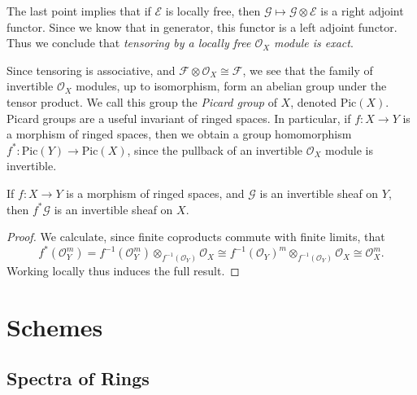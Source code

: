 The last point implies that if $\mathcal{E}$ is locally free, then $\mathcal{G} \mapsto \mathcal{G} \otimes \mathcal{E}$ is a right adjoint functor. Since we know that in generator, this functor is a left adjoint functor. Thus we conclude that \emph{tensoring by a locally free $\mathcal{O}_X$ module is exact}.

Since tensoring is associative, and $\mathcal{F} \otimes \mathcal{O}_X \cong \mathcal{F}$, we see that the family of invertible $\mathcal{O}_X$ modules, up to isomorphism, form an abelian group under the tensor product. We call this group the \emph{Picard group} of $X$, denoted $\text{Pic}(X)$. Picard groups are a useful invariant of ringed spaces. In particular, if $f: X \to Y$ is a morphism of ringed spaces, then we obtain a group homomorphism $f^*: \text{Pic}(Y) \to \text{Pic}(X)$, since the pullback of an invertible $\mathcal{O}_X$ module is invertible.

\begin{theorem}
    If $f: X \to Y$ is a morphism of ringed spaces, and $\mathcal{G}$ is an invertible sheaf on $Y$, then $f^* \mathcal{G}$ is an invertible sheaf on $X$.
\end{theorem}
\begin{proof}
    We calculate, since finite coproducts commute with finite limits, that
    \[ f^*(\mathcal{O}_Y^m) = f^{-1}(\mathcal{O}_Y^m) \otimes_{f^{-1}(\mathcal{O}_Y)} \mathcal{O}_X \cong f^{-1}(\mathcal{O}_Y)^m \otimes_{f^{-1}(\mathcal{O}_Y)} \mathcal{O}_X \cong \mathcal{O}_X^m. \]
    Working locally thus induces the full result.
\end{proof}

\chapter{Schemes}

\section{Spectra of Rings}

